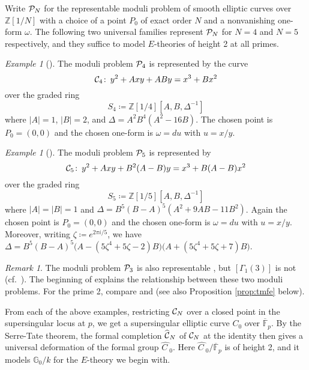 \documentclass{gtpart}
\theoremstyle{definition}
\theoremstyle{remark}
\newtheorem{rmk}[equation]{Remark}
\newtheorem{ex}[equation]{Example}
\def\co{\colon\thinspace}
\newcommand{\mb}[1]{\mathbb{#1}}
\newcommand{\cF}{\overline {\mb F}}
\newcommand{\CC}{{\cal C}}
\newcommand{\CP}{{\cal P}}
\newcommand{\BG}{{\mb G}}
\newcommand{\BZ}{{\mb Z}}
\newcommand{\HC}{\widehat{C~}\!}
\newcommand{\HCC}{\widehat{~\!\!\CC}}
\renewcommand{\D}{\Delta}
\newcommand{\G}{\Gamma}
\renewcommand{\o}{\omega}
\newcommand{\ce}{\coloneqq}
\renewcommand{\=}{\approx}
\renewcommand{\-}{\sim}
\numberwithin{equation}{section}
\begin{document}
Write $\CP_N$ for the representable moduli problem of smooth elliptic curves 
over $\BZ[1/N]$ with a choice of a point $P_0$ of exact order $N$ and a 
nonvanishing one-form $\o$.  The following two universal families represent 
$\CP_N$ for $N = 4$ and $N = 5$ respectively, and they suffice to model 
$E$-theories of height 2 at all primes.  

\begin{ex}[{\cite[Proposition 2.1]{p3}}]
 \label{ex:4}
 The moduli problem $\CP_4$ is represented by the curve 
 \[
  \CC_4 \co y^2 + A x y + A B y = x^3 + B x^2 
 \]
 over the graded ring 
 \[
  S_4 \ce \BZ[1/4][A, B, \D^{-1}] 
 \]
 where $|A| = 1$, $|B| = 2$, and $\D = A^2 B^4 (A^2 - 16 B)$.  The chosen point 
 is $P_0 = (0,0)$ and the chosen one-form is $\o = du$ with $u = x / y$.  
\end{ex}

\begin{ex}[{\cite[Corollary 1.1.10]{tmf5}}]
 \label{ex:5}
 The moduli problem $\CP_5$ is represented by 
 \[
  \CC_5 \co y^2 + A x y + B^2 (A - B) y = x^3 + B (A - B) x^2 
 \]
 over the graded ring 
 \[
  S_5 \ce \BZ[1/5][A, B, \D^{-1}] 
 \]
 where $|A| = |B| = 1$ and $\D = B^5 (B - A)^5 (A^2 + 9 A B - 11 B^2)$.  Again 
 the chosen point is $P_0 = (0,0)$ and the chosen one-form is $\o = du$ with 
 $u = x / y$.  Moreover, writing $\zeta \ce e^{2 \pi i / 5}$, we have $\D = B^5 
 (B - A)^5 \big( A - (5 \zeta^4 + 5 \zeta - 2) B \big) \big( A + (5 \zeta^4 + 5 
 \zeta + 7) B \big)$.  
\end{ex}

\begin{rmk}
 \label{rmk:tmf3}
 The moduli problem $\CP_3$ is also representable \cite[Proposition 3.2]{tmf3}, 
 but $[\G_1(3)]$ is not (cf.~\cite[Corollary 2.7.4]{KM}).  The beginning of 
 \cite[Section 1]{tmf5} explains the relationship between these two moduli 
 problems.  For the prime 2, compare \cite[Corollary 1.1.11]{tmf5} and 
 \cite[Section 3.1]{level3II} (see also Proposition \ref{prop:tmfe} below).  
\end{rmk}

From each of the above examples, restricting $\CC_N$ over a closed point in the 
supersingular locus at $p$, we get a supersingular elliptic curve $C_0$ over 
$\cF_p$.  By the Serre-Tate theorem, the formal completion $\HCC_N$ of $\CC_N$ 
at the identity then gives a universal deformation of the formal group 
$\HC_{\!0}$.  Here $\HC_{\!0} / \cF_p$ is of height 2, and it models $\BG_0 / k$ 
for the $E$-theory we begin with.  
\end{document}
